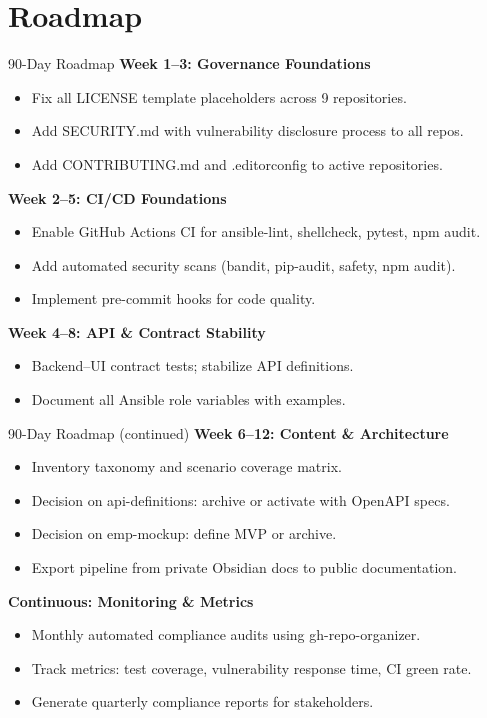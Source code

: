 \documentclass[aspectratio=169]{beamer}
\begin{document}
\section{Roadmap}

\begin{frame}{90-Day Roadmap \; \faRoad}
  \textbf{Week 1–3: Governance Foundations}
  \begin{itemize}
    \item Fix all LICENSE template placeholders across 9 repositories.
    \item Add SECURITY.md with vulnerability disclosure process to all repos.
    \item Add CONTRIBUTING.md and .editorconfig to active repositories.
  \end{itemize}
  
  \textbf{Week 2–5: CI/CD Foundations}
  \begin{itemize}
    \item Enable GitHub Actions CI for ansible-lint, shellcheck, pytest, npm audit.
    \item Add automated security scans (bandit, pip-audit, safety, npm audit).
    \item Implement pre-commit hooks for code quality.
  \end{itemize}
  
  \textbf{Week 4–8: API \& Contract Stability}
  \begin{itemize}
    \item Backend–UI contract tests; stabilize API definitions.
    \item Document all Ansible role variables with examples.
  \end{itemize}
\end{frame}

\begin{frame}{90-Day Roadmap (continued) \; \faRoad}
  \textbf{Week 6–12: Content \& Architecture}
  \begin{itemize}
    \item Inventory taxonomy and scenario coverage matrix.
    \item Decision on api-definitions: archive or activate with OpenAPI specs.
    \item Decision on emp-mockup: define MVP or archive.
    \item Export pipeline from private Obsidian docs to public documentation.
  \end{itemize}
  
  \textbf{Continuous: Monitoring \& Metrics}
  \begin{itemize}
    \item Monthly automated compliance audits using gh-repo-organizer.
    \item Track metrics: test coverage, vulnerability response time, CI green rate.
    \item Generate quarterly compliance reports for stakeholders.
  \end{itemize}
\end{frame}
\end{document}
